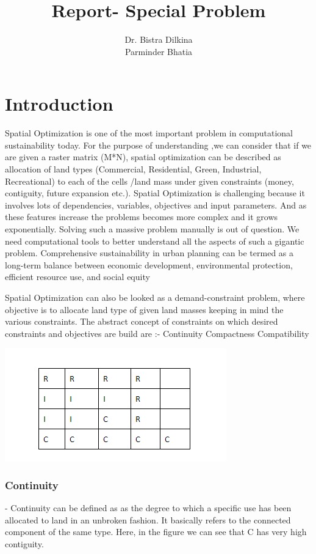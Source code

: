 \documentclass[12pt]{article} %
\title{Report- Special Problem}
\author{
Dr. Bistra Dilkina
\\
\And
Parminder Bhatia
}
\begin{document}
\maketitle
\section{Introduction}
Spatial Optimization is one of the most important problem in computational sustainability today. For the purpose of understanding ,we can consider that if we are given a raster matrix (M*N), spatial optimization can be described as allocation of land types (Commercial, Residential, Green, Industrial, Recreational) to each of the cells /land mass under given constraints (money, contiguity, future expansion etc.).  Spatial Optimization is challenging because it involves lots of dependencies, variables, objectives and input parameters. And as these features increase the problems becomes more complex and it grows exponentially. Solving such a massive problem manually is out of question. We need computational tools to better understand all the aspects of such a gigantic problem.
Comprehensive sustainability in urban planning can be termed as a long-term balance between economic development, environmental protection, efficient resource use, and social equity


Spatial Optimization can also be looked as a demand-constraint problem, where objective is to allocate land type of given land masses keeping in mind the various constraints. The abstract concept of constraints on which  desired constraints and objectives are build are :-
Continuity
Compactness
Compatibility

\graphicspath{ {images/} }
\includegraphics{raster}

\subsubsection*{Continuity} - Continuity can be defined as as the degree to which a specific use has been allocated to land in an unbroken fashion. It basically refers to the connected component of the same type. Here, in the figure we can see that C has very high contiguity.
\end{document}
